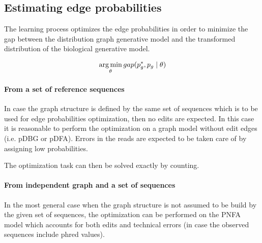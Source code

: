 \subsection{Estimating edge probabilities}


The learning process optimizes the edge probabilities in order to minimize the gap between the distribution graph generative model and the transformed distribution of the biological generative model.

\begin{align*}
	& \operatorname*{arg\,min}_\theta gap(p^*_g, p_g \mid \theta) \\
\end{align*}

\paragraph{From a set of reference sequences}
In case the graph structure is defined by the same set of sequences which is to be used for edge probabilities optimization, then no edits are expected. In this case it is reasonable to perform the optimization on a graph model without edit edges (i.e. pDBG or pDFA). Errors in the reads are expected to be taken care of by assigning low probabilities.

The optimization task can then be solved exactly by counting.

\paragraph{From independent graph and a set of sequences}
In the most general case when the graph structure is not assumed to be build by the given set of sequences, the optimization can be performed on the PNFA model which accounts for both edits and technical errors (in case the observed sequences include phred values).

